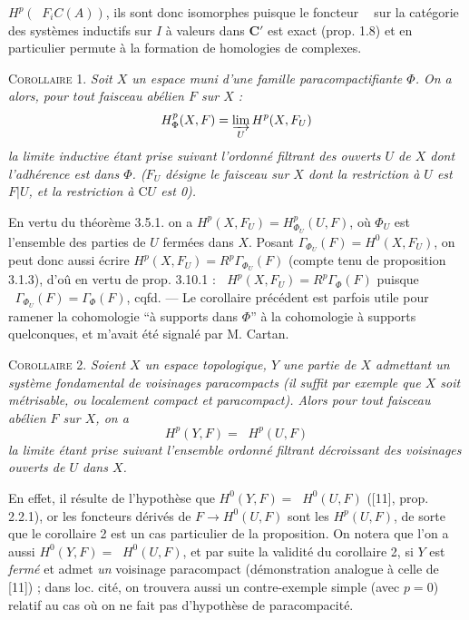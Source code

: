 
$H^p(\mathop{\underset{\to}{\lim}} F_iC(A))$, ils sont donc isomorphes puisque le foncteur
$\mathop{\underset{\to}{\lim}}$ sur la catégorie des systèmes inductifs sur $I$ à valeurs dans
$\mathbf C'$ est exact (prop. 1.8) et en particulier permute à la formation
de homologies de complexes.

\textsc{Corollaire 1.} \textit{Soit $X$ un espace muni d'une famille
paracompactifiante $\Phi$. On a alors, pour tout faisceau abélien $F$ sur
$X$ :}
\[
H^p_{\Phi}(X,F)=\varinjlim\limits_U H^p(X,F_U)
\]
\textit{la limite inductive étant prise suivant l'ordonné filtrant des ouverts
$U$ de $X$ dont l'adhérence est dans $\Phi$. \textup{(}$F_U$ désigne le faisceau sur
$X$ dont la restriction à $U$ est $F|U$, et la restriction à $\mathrm C U$ est \textup{0)}.}

En vertu du théorème 3.5.1. on a
$H^p(X,F_U)=H^p_{\Phi_U}(U,F)$, où $\Phi_U$ est l'ensemble des parties de $U$
fermées dans $X$. Posant $\Gamma_{\Phi_U}(F)=H^0(X,F_U)$, on peut donc aussi
écrire $H^p(X,F_U)=R^p\Gamma_{\Phi_U}(F)$ (compte tenu de proposition
3.1.3), d'oû en vertu de prop. 3.10.1 :
$\mathop{\underset{\to}{\lim}} H^p(X,F_U)=R^p\Gamma_{\Phi}(F)$ puisque
$\mathop{\underset{\to}{\lim}}\Gamma_{\Phi_U}(F)=\Gamma_{\Phi}(F)$, cqfd.
--- Le corollaire précédent est parfois utile pour ramener la cohomologie
``à supports dans $\Phi$'' à la cohomologie à supports quelconques, et m'avait
été signalé par M. Cartan.

\textsc{Corollaire 2.} \textit{Soient $X$ un espace topologique, $Y$
une partie de $X$ admettant un système fondamental de voisinages paracompacts
\textup{(}il suffit par exemple que $X$ soit métrisable, ou localement compact et
paracompact\textup{)}. Alors pour tout faisceau abélien $F$ sur $X$, on a}
\[
H^p(Y,F)=\mathop{\underset{\to}{\lim}} H^p(U,F)
\]
\textit{la limite étant prise suivant l'ensemble ordonné filtrant décroissant
des voisinages ouverts de $U$ dans $X$.}

En effet, il résulte de l'hypothèse que
$H^0(Y,F)=\mathop{\underset{\to}{\lim}} H^0(U,F)$ ([11], prop. 2.2.1), or les foncteurs dérivés
de $F\to H^0(U,F)$ sont les $H^p(U,F)$, de sorte que le corollaire 2
est un cas particulier de la proposition. On notera que l'on a aussi
$H^0(Y,F)=\mathop{\underset{\to}{\lim}} H^0(U,F)$, et par suite la validité du corollaire 2, si
$Y$ est \textit{fermé} et admet \textit{un} voisinage paracompact
(démonstration analogue à celle de [11]) ; dans loc. cité, on trouvera aussi
un contre-exemple simple (avec $p=0$) relatif au cas où on ne fait pas
d'hypothèse de paracompacité.

